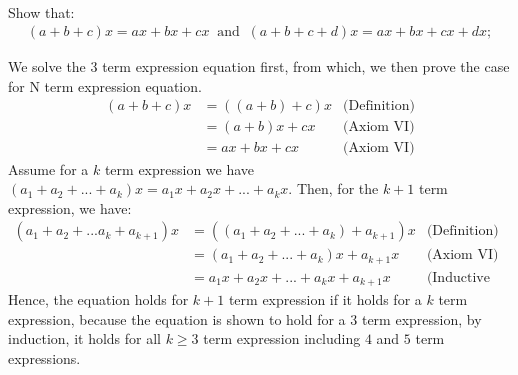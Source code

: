 \documentclass[12pt]{book}
\theoremstyle{definition}
\begin{document}
\begin{ex}[3]
\\
Show that:
\begin{align*}
	(a+b+c)x = ax+bx+cx\;\; \text{and}\;\; (a+b+c+d)x= ax+bx+cx+dx;  	
\end{align*}
\end{ex}
\begin{sol}
We solve the 3 term expression equation first, from which, we then prove the case for N term expression equation.
\begin{align*}
	(a+b+c)x&= ((a+b)+c)x &\text{(Definition)}\\
	&=(a+b)x+cx & \text{(Axiom VI)}\\
	&= ax+bx+cx & \text{(Axiom VI)}
\end{align*}
Assume for a $k$ term expression we have $(a_1+a_2+...+a_k)x= a_1x+a_2x+...+a_kx$. Then, for the $k+1$ term expression, we have:
\begin{align*}
	(a_1+a_2+...a_k+a_{k+1})x &= ((a_1+a_2+...+a_k)+a_{k+1})x & \text{(Definition)}\\
	&= (a_1+a_2+...+a_k)x + a_{k+1}x & \text{(Axiom VI)}\\
	&= a_1x+a_2x+...+a_kx +a_{k+1}x & \text{(Inductive Hypothesis)}
\end{align*}
Hence, the equation holds for $k+1$ term expression if it holds for a $k$ term expression, because the equation is shown to hold for a $3$ term expression, by induction, it holds for all $k\geq 3$ term expression including $4$ and $5$ term expressions.
\end{sol}
\end{document}

